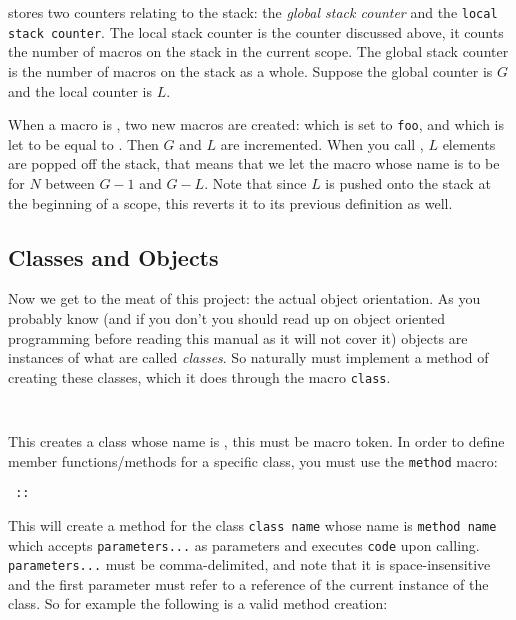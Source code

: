 \OoP stores two counters relating to the stack: the {\it global stack counter} and the {\tt local stack counter}.
The local stack counter is the counter discussed above, it counts the number of macros on the stack in the current scope.
The global stack counter is the number of macros on the stack as a whole.
Suppose the global counter is $G$ and the local counter is $L$.

When a macro {\tt\string\foo} is {\tt\string\localized}, two new macros are created: {\tt\string{}}
which is set to {\tt foo}, and {\tt\string{}} which is let to be equal to {\tt\string\foo}.
Then $G$ and $L$ are incremented.
When you call {\tt\string\endscope}, $L$ elements are popped off the stack, that means that we let the macro whose name is
{\tt\string{}} to be {\tt\string{}} for $N$ between $G-1$ and $G-L$.
Note that since $L$ is pushed onto the stack at the beginning of a scope, this reverts it to its previous definition as well.
\endscare

\subsection{Classes and Objects}

Now we get to the meat of this project: the actual object orientation.
As you probably know (and if you don't you should read up on object oriented programming before reading this manual as it will
not cover it) objects are instances of what are called {\it classes}.
So naturally \OoP must implement a method of creating these classes, which it does through the macro {\tt class}.

\hfil{\tt\string\class\ }\hfil\par

This creates a class whose name is {\tt{}}, this must be macro token.
In order to define member functions/methods for a specific class, you must use the {\tt method} macro:

\hfil{\tt\string\method\ ::}\hfil\par

This will create a method for the class {\tt class name} whose name is {\tt method name} which accepts {\tt parameters...} as
parameters and executes {\tt code} upon calling.
{\tt parameters...} must be comma-delimited, and note that it is space-insensitive and the first parameter must refer to a
reference of the current instance of the class.
So for example the following is a valid method creation:

